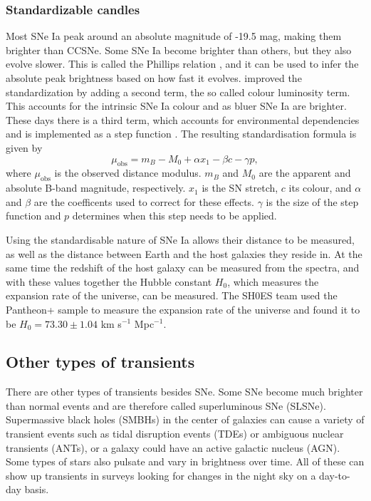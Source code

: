 \documentclass[a4paper,oneside,12pt, class=Latex/Classes/PhDthesisPSnPDF, crop=false]{standalone}
\begin{document}
\subsubsection{Standardizable candles}
\label{Standard_candle}
Most SNe Ia peak around an absolute magnitude of -19.5 mag, making them brighter than CCSNe. Some SNe Ia become brighter than others, but they also evolve slower. This is called the Phillips relation \citep{phillips_rel}, and it can be used to infer the absolute peak brightness based on how fast it evolves. \citet{Tripp_colour_rel} improved the standardization by adding a second term, the so called colour luminosity term. This accounts for the intrinsic SNe Ia colour and as bluer SNe Ia are brighter. These days there is a third term, which accounts for environmental dependencies and is implemented as a step function \citep{Kelly_mass_step, Sullivan_mass_step}. The resulting standardisation formula is given by
\begin{equation}
    \mu_\text{obs} = m_B - M_0 + \alpha x_1 - \beta c - \gamma p,
\end{equation}
where $\mu_\text{obs}$ is the observed distance modulus. $m_B$ and $M_0$ are the apparent and absolute B-band magnitude, respectively. $x_1$ is the SN stretch, $c$ its colour, and $\alpha$ and $\beta$ are the coefficents used to correct for these effects. $\gamma$ is the size of the step function and $p$ determines when this step needs to be applied.

Using the standardisable nature of SNe Ia allows their distance to be measured, as well as the distance between Earth and the host galaxies they reside in. At the same time the redshift of the host galaxy can be measured from the spectra, and with these values together the Hubble constant $H_0$, which measures the expansion rate of the universe, can be measured. The SH0ES team \citep{SH0ES} used the Pantheon+ sample \citep{Pantheon+} to measure the expansion rate of the universe and found it to be $H_0 = 73.30 \pm 1.04$ km s$^{-1}$ Mpc$^{-1}$.


\subsection{Other types of transients}
\label{Other_trans}
There are other types of transients besides SNe. Some SNe become much brighter than normal events and are therefore called superluminous SNe (SLSNe). Supermassive black holes (SMBHs) in the center of galaxies can cause a variety of transient events such as tidal disruption events (TDEs) or ambiguous nuclear transients (ANTs), or a galaxy could have an active galactic nucleus (AGN). Some types of stars also pulsate and vary in brightness over time. All of these can show up transients in surveys looking for changes in the night sky on a day-to-day basis.
\end{document}
